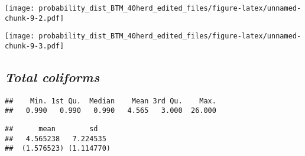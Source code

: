 \documentclass[]{article}
\newenvironment{Shaded}{\begin{snugshade}}{\end{snugshade}}
\newcommand{\KeywordTok}[1]{\textcolor[rgb]{0.13,0.29,0.53}{\textbf{#1}}}
\newcommand{\FloatTok}[1]{\textcolor[rgb]{0.00,0.00,0.81}{#1}}
\newcommand{\StringTok}[1]{\textcolor[rgb]{0.31,0.60,0.02}{#1}}
\newcommand{\CommentTok}[1]{\textcolor[rgb]{0.56,0.35,0.01}{\textit{#1}}}
\newcommand{\OperatorTok}[1]{\textcolor[rgb]{0.81,0.36,0.00}{\textbf{#1}}}
\newcommand{\NormalTok}[1]{#1}
\begin{document}
\texttt{[image: probability\_dist\_BTM\_40herd\_edited\_files/figure-latex/unnamed-chunk-9-2.pdf]}

\begin{Shaded}
\end{Shaded}

\texttt{[image: probability\_dist\_BTM\_40herd\_edited\_files/figure-latex/unnamed-chunk-9-3.pdf]}

\subsection{\texorpdfstring{\textbf{\emph{Total
coliforms}}}{Total coliforms}}\label{total-coliforms}

\begin{Shaded}
\end{Shaded}

\begin{verbatim}
##    Min. 1st Qu.  Median    Mean 3rd Qu.    Max. 
##   0.990   0.990   0.990   4.565   3.000  26.000
\end{verbatim}

\begin{Shaded}
\end{Shaded}

\begin{verbatim}
##      mean        sd   
##   4.565238   7.224535 
##  (1.576523) (1.114770)
\end{verbatim}
\end{document}
